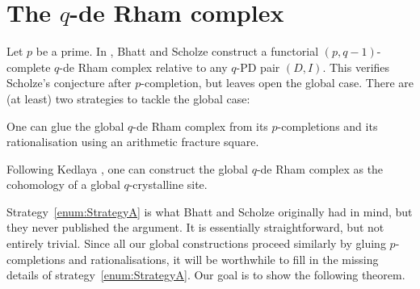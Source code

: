 \documentclass[DIV=12,numbers=enddot,leqno,bibliography=totoc]{scrartcl}
\begin{document}
	\section{The \texorpdfstring{$q$}{q}-de Rham complex}\label{appendix:GlobalqDeRham}
	Let $p$ be a prime. In \cite[\S{}]{Prismatic}, Bhatt and Scholze construct a functorial $(p,q-1)$-complete $q$-de Rham complex relative to any $q$-PD pair $(D,I)$. This verifies Scholze's conjecture \cite[Conjecture~\href{https://arxiv.org/pdf/1606.01796\#theorem.3.1}{3.1}]{Toulouse} after $p$-completion, but leaves open the global case. There are (at least) two strategies to tackle the global case:
	\begin{alphanumerate}
		\item One can glue the global $q$-de Rham complex from its $p$-completions and its rationalisation using an arithmetic fracture square.\label{enum:StrategyA}
		\item Following Kedlaya \cite[\S\href{https://kskedlaya.org/prismatic/sec_q-global.html}{29}]{Kedlaya}, one can construct the global $q$-de Rham complex as the cohomology of a global $q$-crystalline site.\label{enum:StrategyB}
	\end{alphanumerate}
	Strategy~\cref{enum:StrategyA} is what Bhatt and Scholze originally had in mind, but they never published the argument. It is essentially straightforward, but not entirely trivial. Since all our global constructions proceed similarly by gluing $p$-completions and rationalisations, %
	it will be worthwhile to fill in the missing details of strategy~\cref{enum:StrategyA}. Our goal is to show the following theorem.
\end{document}
